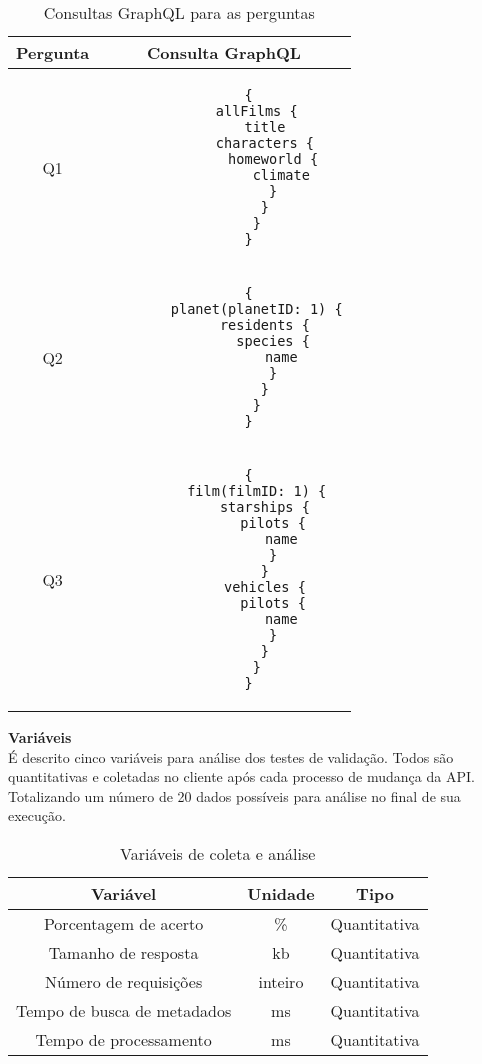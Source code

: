 \begin{table}[H]
  \centering
  \begin{tabular}{|c|c|}
    \hline
    Pergunta & Consulta GraphQL \\
    \hline
    Q1 & \begin{minipage}[t]{0.5\textwidth}
      \begin{verbatim}
      {
        allFilms {
          title
          characters {
            homeworld {
              climate
            }
          }
        }
      }
      \end{verbatim}
    \end{minipage} \\
    \hline
    Q2 & \begin{minipage}[t]{0.5\textwidth}
      \begin{verbatim}
      {
        planet(planetID: 1) {
          residents {
            species {
              name
            }
          }
        }
      }
      \end{verbatim}
    \end{minipage} \\
    \hline
    Q3 & \begin{minipage}[t]{0.5\textwidth}
      \begin{verbatim}
      {
        film(filmID: 1) {
          starships {
            pilots {
              name
            }
          }
          vehicles {
            pilots {
              name
            }
          }
        }
      }
      \end{verbatim}
    \end{minipage} \\
    \hline
  \end{tabular}
  \caption{Consultas GraphQL para as perguntas}
\end{table}

\textbf{Variáveis} \\

É descrito cinco variáveis para análise dos testes de validação. Todos são quantitativas e coletadas no cliente após cada processo de mudança da API. Totalizando um número de 20 dados possíveis para análise no final de sua execução.

\begin{table}[H]
  \centering
  \begin{tabular}{|c|c|c|}
    \hline
    Variável & Unidade & Tipo \\
    \hline
    Porcentagem de acerto & \% & Quantitativa \\
    \hline
    Tamanho de resposta & kb & Quantitativa \\
    \hline
    Número de requisições & inteiro & Quantitativa \\
    \hline
    Tempo de busca de metadados & ms & Quantitativa \\
    \hline
    Tempo de processamento & ms & Quantitativa \\
    \hline
  \end{tabular}
  \caption{Variáveis de coleta e análise}
\end{table}
